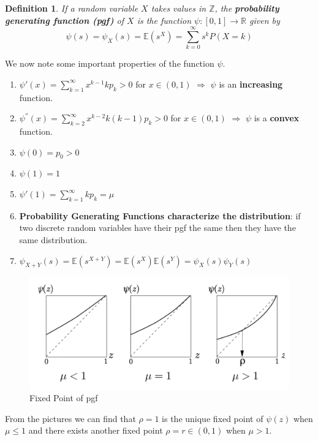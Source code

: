 \documentclass[11pt,a4paper]{article}
\newtheorem{definition}{Definition}
\begin{document}
\begin{definition}
    If a random variable $X$ takes values in $\mathbb{Z}$, the \textbf{probability generating function (pgf)} of $X$ is the function $\psi : [0,1] \rightarrow \mathbb{R}$ given by $$\psi(s)=\psi_X(s)=\mathbb{E}(s^X)=\sum_{k=0}^\infty s^k P(X=k)$$
\end{definition}

We now note some important properties of the function $\psi$.
\begin{enumerate}
    \item $\psi'(x)=\sum_{k=1}^\infty x^{k-1}k p_k>0$ for $x\in (0,1)$ $\Rightarrow$ $\psi$ is an \textbf{increasing} function.
    \item $\psi^{''}(x)=\sum_{k=2}^\infty x^{k-2}k(k-1) p_k>0$ for $x\in (0,1)$ $\Rightarrow$ $\psi$ is a \textbf{convex} function.
    \item $\psi(0)=p_0>0$
    \item $\psi(1)=1$
    \item $\psi'(1)=\sum_{k=1}^\infty k p_k=\mu$
    \item \textbf{Probability Generating Functions characterize the distribution}: if two discrete random variables have their pgf the same then they have the same distribution.
    \item $\psi_{X+Y}(s)=\mathbb{E}(s^{X+Y})=\mathbb{E}(s^X)\mathbb{E}(s^Y)=\psi_X(s)\psi_Y(s)$
\end{enumerate}

\begin{center}\begin{figure}[htbp]
    \centering
    \includegraphics[scale=0.2]{pgf.png}
    \caption{Fixed Point of pgf}
    \label{}
\end{figure}\end{center}

From the pictures we can find that $\rho=1$ is the unique fixed point of $\psi(z)$ when $\mu\leq 1$ and there exists another fixed point $\rho=r\in (0,1)$ when $\mu>1$.
\end{document}
